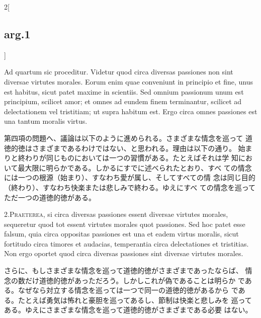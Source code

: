 \documentclass[paper=a4paper,fontsize=10pt,jafontsize=9pt,titlepage]{jlreq}
\begin{document}
\begin{paracol}{2}[\subsection{arg.1}]

Ad quartum sic proceditur. Videtur quod circa diversas passiones non
 sint diversae virtutes morales. Eorum enim quae conveniunt in
 principio et fine, unus est habitus, sicut patet maxime in
 scientiis. Sed omnium passionum unum est principium, scilicet amor;
 et omnes ad eundem finem terminantur, scilicet ad delectationem vel
 tristitiam; ut supra habitum est. Ergo circa omnes passiones est una
 tantum moralis virtus.

\switchcolumn

第四項の問題へ、議論は以下のように進められる。さまざまな情念を巡って
 道徳的徳はさまざまであるわけではない、と思われる。理由は以下の通り。
 始まりと終わりが同じものにおいては一つの習慣がある。たとえばそれは学
 知において最大限に明らかである。しかるにすでに述べられたとおり、すべ
 ての情念には一つの根源（始まり）、すなわち愛が属し、そしてすべての情
 念は同じ目的（終わり）、すなわち快楽または悲しみで終わる。ゆえにすべ
 ての情念を巡ってただ一つの道徳的徳がある。


2.{\scshape Praeterea}, si circa diversas passiones essent diversae
virtutes morales, sequeretur quod tot essent virtutes morales quot
passiones. Sed hoc patet esse falsum, quia circa oppositas passiones
est una et eadem virtus moralis, sicut fortitudo circa timores et
audacias, temperantia circa delectationes et tristitias. Non ergo
oportet quod circa diversas passiones sint diversae virtutes morales.

\switchcolumn

さらに、もしさまざまな情念を巡って道徳的徳がさまざまであったならば、
 情念の数だけ道徳的徳があっただろう。しかしこれが偽であることは明らか
 である。なぜなら対立する情念を巡っては一つで同一の道徳的徳があるから
 である。たとえば勇気は怖れと豪胆を巡ってあるし、節制は快楽と悲しみを
 巡ってある。ゆえにさまざまな情念を巡って道徳的徳がさまざまである必要
 はない。



\end{paracol}
\end{document}

